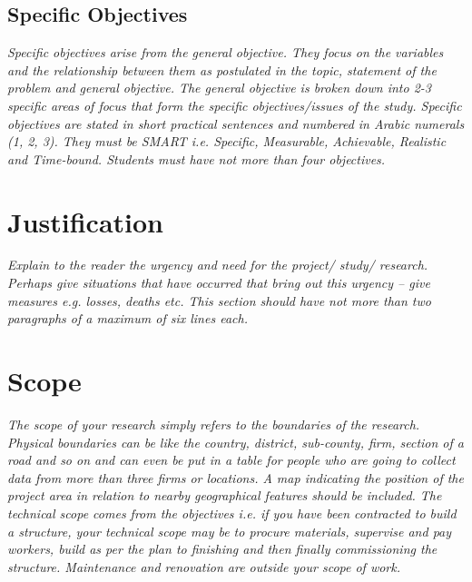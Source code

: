 \subsection{Specific Objectives}
\emph{Specific objectives arise from the general objective.
	They focus on the variables and the relationship between them as postulated in the topic, statement of the problem and general objective.
	The general objective is broken down into 2-3 specific areas of focus that form the specific objectives/issues of the study.
	Specific objectives are stated in short practical sentences and numbered in Arabic numerals (1, 2, 3).
	They must be SMART i.e. Specific, Measurable, Achievable, Realistic and Time-bound.
	Students must have not more than four objectives.}

\section{Justification}
\emph{Explain to the reader the urgency and need for the project/ study/ research.
	Perhaps give situations that have occurred that bring out this urgency – give measures e.g. losses, deaths etc.
	This section should have not more than two paragraphs of a maximum of six lines each.}

\section{Scope}
\emph{The scope of your research simply refers to the boundaries of the research.
	Physical boundaries can be like the country, district, sub-county, firm, section of a road and so on and can even be put in a table for people who are going to collect data from more than three firms or locations.
	A map indicating the position of the project area in relation to nearby geographical features should be included.
	The technical scope comes from the objectives i.e. if you have been contracted to build a structure, your technical scope may be to procure materials, supervise and pay workers, build as per the plan to finishing and then finally commissioning the structure.
	Maintenance and renovation are outside your scope of work.}

